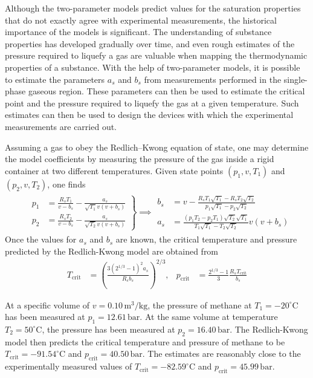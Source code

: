 Although the two-parameter models predict values for the saturation properties that do not exactly agree with experimental measurements, the historical importance of the models is significant. The understanding of substance properties has developed gradually over time, and even rough estimates of the pressure required to liquefy a gas are valuable when mapping the thermodynamic properties of a substance. 
With the help of two-parameter models, it is possible to estimate the parameters $a_s$ and $b_s$ from measurements performed in the single-phase gaseous region. These parameters can then be used to estimate the critical point and the pressure required to liquefy the gas at a given temperature. Such estimates can then be used to design the devices with which the experimental measurements are carried out.
\begin{example}
    Assuming a gas to obey the Redlich–Kwong equation of state, one may determine the model coefficients by measuring the pressure of the gas inside a rigid container at two different temperatures. Given state points $(p_1,v,T_1)$ and $(p_2,v,T_2)$, one finds
    \begin{align*}
        &\left.\begin{aligned}
        p_1&=\frac{R_sT_1}{v-b_s}-\frac{a_s}{\sqrt{T_1} v(v+b_s)}\\
        p_2&=\frac{R_sT_2}{v-b_s}-\frac{a_s}{\sqrt{T_2} v(v+b_s)}
        \end{aligned}\right\}\implies 
        \begin{aligned}
        b_s&=v-\frac{R_sT_1\sqrt{T_1}-R_sT_2\sqrt{T_2} }{p_1\sqrt{T_1}-p_2\sqrt{T_2}}\\
        a_s&=\frac{(p_1T_2-p_2T_1)\sqrt{T_2}\sqrt{T_1}}{T_1\sqrt{T_1}-T_2\sqrt{T_2}} v(v+b_s)
        \end{aligned}
    \end{align*}
    Once the values for $a_s$ and $b_s$ are known, the critical temperature and pressure predicted by the Redlich-Kwong model are obtained from
    \begin{align*}
        T_\text{crit}&=\left(\frac{3(2^{1/3}-1)^2a_s}{R_sb_s}\right)^{2/3}, &
        p_\text{crit}&=\frac{2^{1/3}-1}{3}\frac{R_sT_\text{crit}}{b_s}
    \end{align*}
    
    At a specific volume of $v=0.10\,\text{m}^3/\text{kg}$, the pressure of methane at $T_1=-20^\circ\text{C}$ has been measured at $p_1=12.61\,\text{bar}$. At the same volume at temperature $T_2=50^\circ\text{C}$, the pressure has been measured at $p_2=16.40\,\text{bar}$. The Redlich-Kwong model then predicts the critical temperature and pressure of methane to be $T_\text{crit}=-91.54^\circ\text{C}$ and $p_\text{crit}=40.50\,\text{bar}$. The estimates are reasonably close to the experimentally measured values of $T_\text{crit}=-82.59^\circ\text{C}$ and $p_\text{crit}=45.99\,\text{bar}$.
\end{example}

